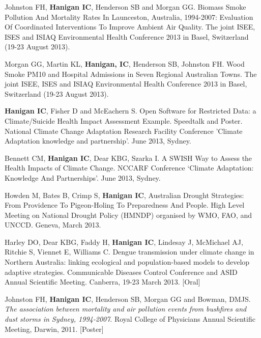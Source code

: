 \documentclass[a4paper,11pt]{article}
\begin{document}
\begin{revnumerate}

\item Johnston FH, \textbf{Hanigan IC}, Henderson SB and Morgan GG. Biomass Smoke Pollution And Mortality Rates In Launceston, Australia, 1994-2007: Evaluation Of Coordinated Interventions To Improve Ambient Air Quality.  The joint ISEE, ISES and ISIAQ Environmental Health Conference 2013 in Basel, Switzerland (19-23 August 2013).

\item Morgan GG, Martin KL, \textbf{Hanigan, IC}, Henderson SB, Johnston FH.  Wood Smoke PM10 and Hospital Admissions in Seven Regional Australian Towns.
The joint ISEE, ISES and ISIAQ Environmental Health Conference 2013 in Basel, Switzerland (19-23 August 2013).

\item \textbf{Hanigan IC}, Fisher D and McEachern S. Open Software for Restricted Data: a Climate/Suicide Health Impact Assessment Example. Speedtalk and Poster. National Climate Change Adaptation Research Facility  Conference 'Climate Adaptation knowledge and partnership'. June 2013, Sydney.

\item Bennett CM, \textbf{Hanigan IC}, Dear KBG, Szarka I. A SWISH Way to Assess the Health Impacts of Climate Change. NCCARF Conference ‘Climate Adaptation: Knowledge And Partnerships’. June 2013, Sydney.

\item Howden M, Bates B, Crimp S, \textbf{Hanigan IC}, Australian Drought Strategies: From Providence To Pigeon-Holing To Preparedness And People. High Level Meeting on National Drought Policy (HMNDP) organised by WMO, FAO, and UNCCD. Geneva, March 2013. 

\item Harley DO, Dear KBG, Faddy H, \textbf{Hanigan IC}, Lindesay J, McMichael AJ, Ritchie S, Viennet E, Williams C. Dengue transmission under climate change in Northern Australia: linking ecological and population-based models to develop adaptive strategies. Communicable Diseases Control Conference and ASID Annual Scientific Meeting. Canberra, 19-23 March 2013.  [Oral]

\item Johnston FH, \textbf{Hanigan IC}, Henderson SB, Morgan GG and Bowman, DMJS. \emph{The association between mortality and air pollution events from bushfires and dust storms in Sydney, 1994-2007}. Royal College of Physicians Annual Scientific Meeting, Darwin,  2011. [Poster]


\end{revnumerate}
\end{document}
